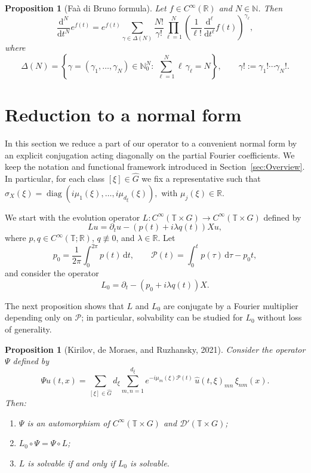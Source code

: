 \documentclass[11pt,reqno]{amsart}
\numberwithin{equation}{section}
\newtheorem{proposition}[theorem]{Proposition}
\begin{document}
	
	\begin{proposition}[Fa\`a di Bruno formula]\label{prop:faa_di_bruno}
		Let $f\in C^\infty(\mathbb{R})$ and $N\in\mathbb{N}$. Then
		\[
		\frac{\mathrm{d}^N}{\mathrm{d}t^N} e^{f(t)}
		= e^{f(t)}\sum_{\gamma\in\Delta(N)}\frac{N!}{\gamma!}
		\prod_{\ell=1}^N \left( \frac{1}{\ell!}\, \frac{\mathrm{d}^\ell} {\mathrm{d}t^\ell} f(t) \right)^{\gamma_\ell},
		\]
		where
		\[
		\Delta(N)=\left\{\gamma=(\gamma_1,\dots,\gamma_N)\in\mathbb{N}_0^N:\ \sum_{\ell=1}^N \ell\,\gamma_\ell=N\right\},
		\qquad \gamma!:=\gamma_1!\cdots\gamma_N!.
		\]
	\end{proposition}
	
	\section{Reduction to a normal form}\label{sec:normalform}
	
	In this section we reduce a part of our operator to a convenient normal form by an explicit conjugation acting diagonally on the partial Fourier coefficients. We keep the notation and functional framework introduced in Section~\ref{sec:Overview}. In particular, for each class $[\xi]\in\widehat{G}$ we fix a representative such that \(	\sigma_X(\xi) = \operatorname{diag} (i\mu_1(\xi),\dots,i\mu_{d_\xi}(\xi)),\) with \(\mu_j(\xi)\in\mathbb{R}.\)
	
	We start with the evolution operator $L: C^\infty(\mathbb{T} \times G) \to C^\infty(\mathbb{T} \times G)$ defined by
	\[
	Lu=\partial_t u-(p(t)+i\lambda q(t))Xu,
	\]
	where $p,q\in C^\infty(\mathbb{T};\mathbb{R})$, $q\not\equiv 0$, and $\lambda\in\mathbb{R}$. Let
	\[
	p_0=\frac{1}{2\pi}\int_0^{2\pi}p(t)\,\mathrm{d}t,
	\qquad
	\mathcal{P}(t)=\int_0^t p(\tau)\,\mathrm{d}\tau-p_0 t,
	\]
	and consider the operator
	\[
	L_0=\partial_t-(p_0+i\lambda q(t))X.
	\]
	
	The next proposition shows that $L$ and $L_0$ are conjugate by a Fourier multiplier depending only on $\mathcal{P}$; in particular, solvability can be studied for $L_0$ without loss of generality.
	
	\begin{proposition}[Kirilov, de Moraes, and Ruzhansky, 2021]\label{prop:normal_form}
		Consider the operator $\Psi$ defined by
		\[
		\Psi u(t,x)=\sum_{[\xi]\in\widehat{G}} d_\xi \sum_{m,n=1}^{d_\xi}
		e^{-i\mu_m(\xi)\mathcal{P}(t)}\,\widehat{u}(t,\xi)_{mn}\,\xi_{nm}(x).
		\]
		Then:
		\begin{enumerate}
			\item[(a)] $\Psi$ is an automorphism of $C^\infty(\mathbb{T}\times G)$ and $\mathcal{D}'(\mathbb{T}\times G)$;
			\item[(b)] $L_0\circ\Psi=\Psi\circ L$;
			\item[(c)] $L$ is solvable if and only if $L_0$ is solvable.
		\end{enumerate}
	\end{proposition}
	
\end{document}
